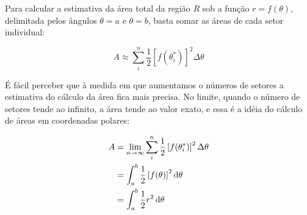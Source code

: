 Para calcular a estimativa da área total da região $R$ sob a função $r = f(\theta)$,
delimitada pelos ângulos $\theta = a$ e $\theta =  b$, basta somar as
áreas de cada setor individual:

\begin{equation}
    A \approx \sum_i^n \frac{1}{2}\left[f(\theta_i^*)\right]^2 \Delta \theta
\end{equation}

É fácil perceber que à medida em que aumentamos o números de setores a
estimativa do cálculo da área fica mais precisa. No limite, quando o
número de setores tende ao infinito, a área tende ao valor exato, e
essa é a idéia do cálculo de áreas em coordenadas polares:

\begin{equation}
  \begin{split}
  A &= \lim_{n \to \infty} \sum_i^n
  \frac{1}{2}\left[f(\theta_i^*)\right]^2 \Delta \theta\\
  &= \int_a^b \frac{1}{2}\left[f(\theta)\right]^2 \mathop{}\!\mathrm{d} \theta\\
  &= \int_a^b \frac{1}{2}r^2 \mathop{}\!\mathrm{d} \theta
  \end{split}
\end{equation}
